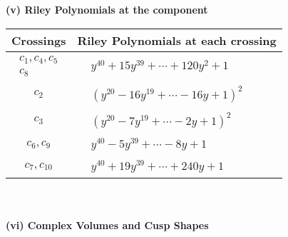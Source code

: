 \documentclass[1p]{elsarticle_modified}
\theoremstyle{definition}
\begin{document}
\newpage\renewcommand{\arraystretch}{1}
\flushleft \textbf{(v) Riley Polynomials at the component}\newline \\
\begin{tabular}{m{50pt}|m{274pt}}
Crossings & \hspace{64pt}Riley Polynomials at each crossing \\
\hline $$\begin{aligned}c_{1},c_{4},c_{5}\\c_{8}\end{aligned}$$&$\begin{aligned}
&y^{40}+15 y^{39}+\cdots+120 y^2+1
\end{aligned}$\\
\hline $$\begin{aligned}c_{2}\end{aligned}$$&$\begin{aligned}
&(y^{20}-16 y^{19}+\cdots-16 y+1)^{2}
\end{aligned}$\\
\hline $$\begin{aligned}c_{3}\end{aligned}$$&$\begin{aligned}
&(y^{20}-7 y^{19}+\cdots-2 y+1)^{2}
\end{aligned}$\\
\hline $$\begin{aligned}c_{6},c_{9}\end{aligned}$$&$\begin{aligned}
&y^{40}-5 y^{39}+\cdots-8 y+1
\end{aligned}$\\
\hline $$\begin{aligned}c_{7},c_{10}\end{aligned}$$&$\begin{aligned}
&y^{40}+19 y^{39}+\cdots+240 y+1
\end{aligned}$\\
\hline
\end{tabular}\\~\\
\newpage\flushleft \textbf{(vi) Complex Volumes and Cusp Shapes}
\end{document}

